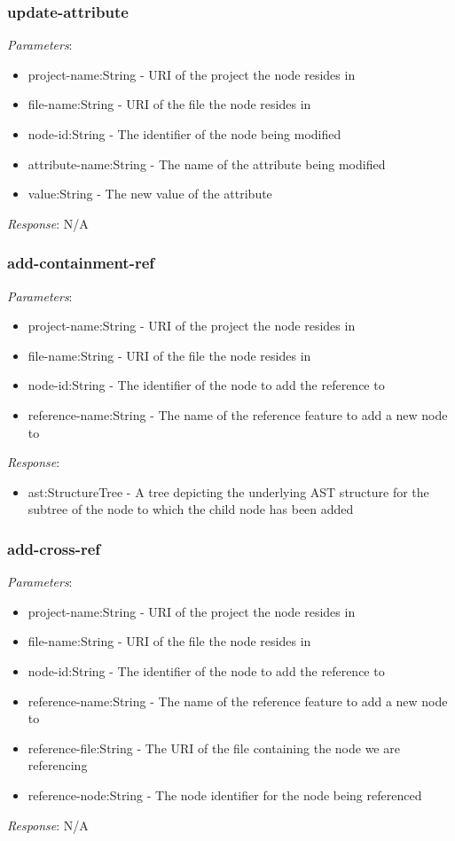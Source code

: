\documentclass{article}
\begin{document}
\subsubsection{update-attribute}
\emph{Parameters}: 
\begin{itemize}
\item project-name:String - URI of the project the node resides in
\item file-name:String - URI of the file the node resides in
\item node-id:String - The identifier of the node being modified
\item attribute-name:String - The name of the attribute being modified
\item value:String - The new value of the attribute
\end{itemize}
\emph{Response}: N/A
\subsubsection{add-containment-ref}
\emph{Parameters}: 
\begin{itemize}
\item project-name:String - URI of the project the node resides in
\item file-name:String - URI of the file the node resides in
\item node-id:String - The identifier of the node to add the reference to
\item reference-name:String - The name of the reference feature to add a new node to
\end{itemize}
\emph{Response}: 
\begin{itemize}
\item ast:StructureTree - A tree depicting the underlying AST structure for the subtree of the node to which the child node has been added
\end{itemize}

\subsubsection{add-cross-ref}
\emph{Parameters}: 
\begin{itemize}
\item project-name:String - URI of the project the node resides in
\item file-name:String - URI of the file the node resides in
\item node-id:String - The identifier of the node to add the reference to
\item reference-name:String - The name of the reference feature to add a new node to
\item reference-file:String - The URI of the file containing the node we are referencing
\item reference-node:String - The node identifier for the node being referenced
\end{itemize}
\emph{Response}: N/A
\end{document}
